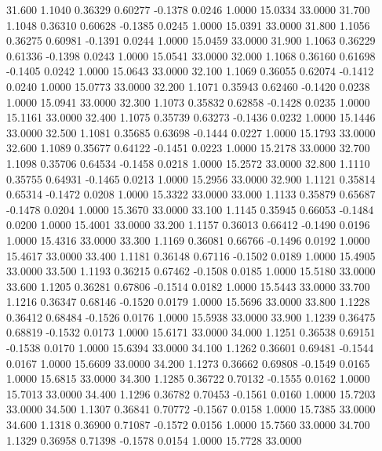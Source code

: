   31.600   1.1040   0.36329   0.60277  -0.1378   0.0246   1.0000  15.0334  33.0000
  31.700   1.1048   0.36310   0.60628  -0.1385   0.0245   1.0000  15.0391  33.0000
  31.800   1.1056   0.36275   0.60981  -0.1391   0.0244   1.0000  15.0459  33.0000
  31.900   1.1063   0.36229   0.61336  -0.1398   0.0243   1.0000  15.0541  33.0000
  32.000   1.1068   0.36160   0.61698  -0.1405   0.0242   1.0000  15.0643  33.0000
  32.100   1.1069   0.36055   0.62074  -0.1412   0.0240   1.0000  15.0773  33.0000
  32.200   1.1071   0.35943   0.62460  -0.1420   0.0238   1.0000  15.0941  33.0000
  32.300   1.1073   0.35832   0.62858  -0.1428   0.0235   1.0000  15.1161  33.0000
  32.400   1.1075   0.35739   0.63273  -0.1436   0.0232   1.0000  15.1446  33.0000
  32.500   1.1081   0.35685   0.63698  -0.1444   0.0227   1.0000  15.1793  33.0000
  32.600   1.1089   0.35677   0.64122  -0.1451   0.0223   1.0000  15.2178  33.0000
  32.700   1.1098   0.35706   0.64534  -0.1458   0.0218   1.0000  15.2572  33.0000
  32.800   1.1110   0.35755   0.64931  -0.1465   0.0213   1.0000  15.2956  33.0000
  32.900   1.1121   0.35814   0.65314  -0.1472   0.0208   1.0000  15.3322  33.0000
  33.000   1.1133   0.35879   0.65687  -0.1478   0.0204   1.0000  15.3670  33.0000
  33.100   1.1145   0.35945   0.66053  -0.1484   0.0200   1.0000  15.4001  33.0000
  33.200   1.1157   0.36013   0.66412  -0.1490   0.0196   1.0000  15.4316  33.0000
  33.300   1.1169   0.36081   0.66766  -0.1496   0.0192   1.0000  15.4617  33.0000
  33.400   1.1181   0.36148   0.67116  -0.1502   0.0189   1.0000  15.4905  33.0000
  33.500   1.1193   0.36215   0.67462  -0.1508   0.0185   1.0000  15.5180  33.0000
  33.600   1.1205   0.36281   0.67806  -0.1514   0.0182   1.0000  15.5443  33.0000
  33.700   1.1216   0.36347   0.68146  -0.1520   0.0179   1.0000  15.5696  33.0000
  33.800   1.1228   0.36412   0.68484  -0.1526   0.0176   1.0000  15.5938  33.0000
  33.900   1.1239   0.36475   0.68819  -0.1532   0.0173   1.0000  15.6171  33.0000
  34.000   1.1251   0.36538   0.69151  -0.1538   0.0170   1.0000  15.6394  33.0000
  34.100   1.1262   0.36601   0.69481  -0.1544   0.0167   1.0000  15.6609  33.0000
  34.200   1.1273   0.36662   0.69808  -0.1549   0.0165   1.0000  15.6815  33.0000
  34.300   1.1285   0.36722   0.70132  -0.1555   0.0162   1.0000  15.7013  33.0000
  34.400   1.1296   0.36782   0.70453  -0.1561   0.0160   1.0000  15.7203  33.0000
  34.500   1.1307   0.36841   0.70772  -0.1567   0.0158   1.0000  15.7385  33.0000
  34.600   1.1318   0.36900   0.71087  -0.1572   0.0156   1.0000  15.7560  33.0000
  34.700   1.1329   0.36958   0.71398  -0.1578   0.0154   1.0000  15.7728  33.0000
